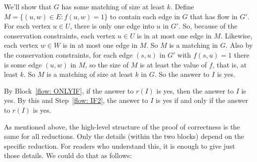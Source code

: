 \begin{longFormProof}
\begin{block}
    \step We'll show that $G$ has some matching of size at least $k$.
    \step Define $M = \{(u,w)\in E : f(u,w) = 1\}$
    to contain each edge in $G$ that has flow in $G'$.
    \step For each vertex $u\in U$, there is only one edge into $u$ in $G'$.
    \step So, because of the conservation constraints, each vertex $u\in U$ is in at most one edge in $M$. 
    \step Likewise, each vertex $w\in W$ is in at most one edge in $M$.
    \step So $M$ is a matching in $G$.
    \step Also by the conservation constraints,
    for each edge $(s, u)$ in $G'$ with $f(s, u) = 1$
    there is some edge $(u,w)$ in $M$,
    so the size of $M$ is at least the value of $f$, that is, at least $k$.
    \step So $M$ is a matching of size at least $k$ in $G$.
    \step So the answer to $I$ is \textsf{yes}. 
  \end{block}
  
  \medskip
  
  \step By Block~\ref{flow: ONLYIF}, if the answer to $r(I)$ is \textsf{yes}, then the answer to $I$ is \textsf{yes}.
  \step By this and Step~\ref{flow: IF2},
  the answer to $I$ is \textsf{yes} if and only if the answer to $r(I)$ is \textsf{yes}.
\end{longFormProof}

As mentioned above, the high-level structure of the proof of correctness is the same
for all reductions.  Only the details (within the two blocks) depend on the specific reduction.
For readers who understand this, it is enough to give just those details.
We could do that as follows:

\newpage

